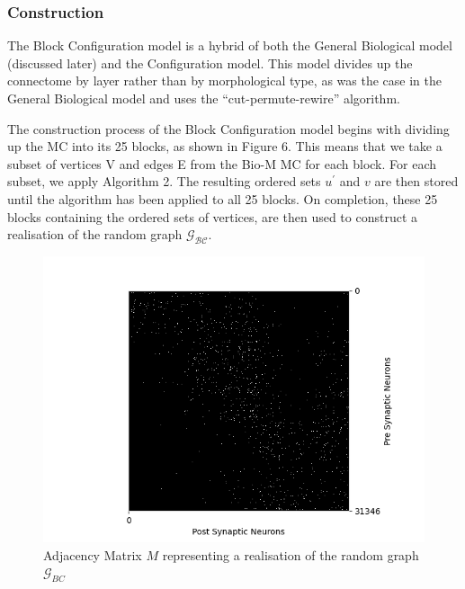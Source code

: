 \subsubsection{Construction}
The Block Configuration model is a hybrid of both the General Biological model (discussed later) and the Configuration model. This model divides up the connectome by layer rather than by morphological type, as was the case in the General Biological model and uses the ``cut-permute-rewire'' \cite{WattsStrogatz1998} algorithm.

The construction process of the Block Configuration model begins with dividing up the MC into its 25 blocks, as shown in Figure 6. This means that we take a subset of vertices V and edges E from the Bio-M MC for each block. For each subset, we apply Algorithm 2. The resulting ordered sets $u^\prime$ and $v$ are then stored until the algorithm has been applied to all 25 blocks. On completion, these 25 blocks containing the ordered sets of vertices, are then used to construct a realisation of the random graph $\mathcal{G_{BC}}$.


\begin{figure}[H]
\begin{center}
\captionsetup{justification=centering}
\includegraphics[width=12cm]{BC/matrix_Block_Configuration.png}
\caption{Adjacency Matrix $M$ representing a realisation of the random graph $\mathcal{G}_{BC}$}
\end{center}
\end{figure}


